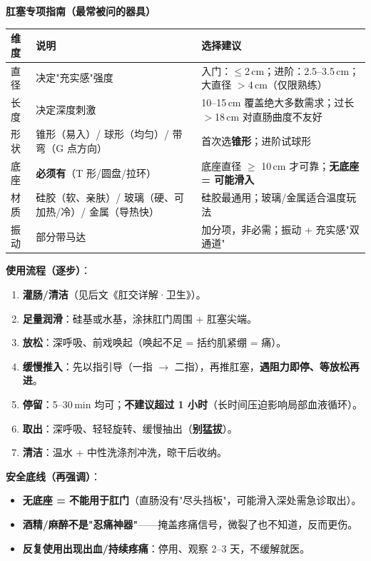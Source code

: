 \documentclass[12pt,UTF8,openany]{ctexbook}
\begin{document}
\textbf{肛塞专项指南（最常被问的器具）}\\
\begin{tabularx}{\textwidth}{l X X}
\toprule
\textbf{维度} & \textbf{说明} & \textbf{选择建议} \\
\midrule
直径 & 决定"充实感"强度 & 入门：$\leq$2\,cm；进阶：2.5--3.5\,cm；大直径 $>$4\,cm（仅限熟练） \\
长度 & 决定深度刺激 & 10--15\,cm 覆盖绝大多数需求；过长 $>$18\,cm 对直肠曲度不友好 \\
形状 & 锥形（易入）/ 球形（均匀）/ 带弯（G 点方向） & 首次选\textbf{锥形}；进阶试球形 \\
底座 & \textbf{必须有}（T 形/圆盘/拉环） & 底座直径 $\geq$ 10\,cm 才可靠；\textbf{无底座 = 可能滑入} \\
材质 & 硅胶（软、亲肤）/ 玻璃（硬、可加热/冷）/ 金属（导热快） & 硅胶最通用；玻璃/金属适合温度玩法 \\
振动 & 部分带马达 & 加分项，非必需；振动 + 充实感"双通道" \\
\bottomrule
\end{tabularx}
\par\smallskip
\noindent\textbf{使用流程（逐步）}：
\begin{enumerate}[leftmargin=2em,itemsep=0.2em]
  \item \textbf{灌肠/清洁}（见后文《肛交详解·卫生》）。
  \item \textbf{足量润滑}：硅基或水基，涂抹肛门周围 + 肛塞尖端。
  \item \textbf{放松}：深呼吸、前戏唤起（唤起不足 = 括约肌紧绷 = 痛）。
  \item \textbf{缓慢推入}：先以指引导（一指 $\to$ 二指），再推肛塞，\textbf{遇阻力即停、等放松再进}。
  \item \textbf{停留}：5--30\,min 均可；\textbf{不建议超过 1 小时}（长时间压迫影响局部血液循环）。
  \item \textbf{取出}：深呼吸、轻轻旋转、缓慢抽出（\textbf{别猛拔}）。
  \item \textbf{清洁}：温水 + 中性洗涤剂冲洗，晾干后收纳。
\end{enumerate}
\noindent\textbf{安全底线（再强调）}：
\begin{itemize}[leftmargin=2em,itemsep=0.2em]
  \item \textbf{无底座 = 不能用于肛门}（直肠没有"尽头挡板"，可能滑入深处需急诊取出）。
  \item \textbf{酒精/麻醉不是"忍痛神器"}——掩盖疼痛信号，微裂了也不知道，反而更伤。
  \item \textbf{反复使用出现出血/持续疼痛}：停用、观察 2--3 天，不缓解就医。
\end{itemize}
\end{document}
